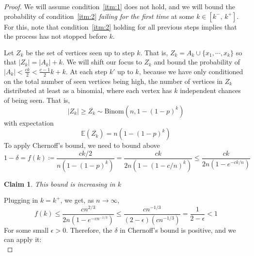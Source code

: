 \documentclass{amsart}
\theoremstyle{plain}
\newtheorem*{claim}{\textbf{Claim}}
\theoremstyle{definition}
\begin{document}
    \begin{proof}
        \vspace{-3mm}
        We will assume condition~\ref{itm:1} does not hold, and we will bound the probability of
        condition~\ref{itm:2} \emph{failing for the first time} at some $k \in [k^{-}, \, k^{+}]$.
        For this, note that condition~\ref{itm:2} holding for all previous steps implies that
        the process has not stopped before $k$.

        \noindent Let $Z_k$ be the set of vertices seen up to step $k$.
        That is, $Z_k = A_k \cup \{x_1, \cdots, x_k\}$ so that $|Z_k| = |A_k| + k$.
        We will shift our focus to $Z_k$ and bound the probability of $|A_k| < \frac{ck}{2} < \frac{c-1}{2}k + k$.
        At each step $k'$ up to $k$, because we have only conditioned on the total number of seen vertices being high,
        the number of vertices in $Z_k$ distributed at least as a binomial,
        where each vertex has $k$ independent chances of being seen.
        That is,
        \begin{equation}
            |Z_k| \geq \overline{Z_k} \sim \text{Binom}\left(n, 1 - (1 - p)^k\right)
            \label{eq:binom}
        \end{equation}
        with expectation
        \begin{equation}
            \mathbb{E}\left(\overline{Z_k}\right) = n\left(1 - (1 - p)^k\right)
            \label{eq:expec}
        \end{equation}
    To apply Chernoff's bound, we need to bound above
    \begin{equation}
        1 - \delta = f(k) \coloneqq \frac{ck/2}{n\left(1 - (1 - p)^k\right)} =
        \frac{ck}{2n\left(1 - (1 - c/n)^k\right)} \leq \frac{ck}{2n\left(1 - e^{-ck/n}\right)}
        \label{eq:ff}
    \end{equation}
    \begin{claim}
        This bound is increasing in $k$ %
    \end{claim}
    \noindent Plugging in $k = k^{+}$, we get, as $n \to \infty$,
    \begin{equation}
        f(k) \leq
        \frac{cn^{2/3}}{2n\left(1 - e^{-cn^{-1/3}}\right)} \leq
        \frac{cn^{-1/3}}{(2-\epsilon)\left(cn^{-1/3}\right)} = \frac{1}{2-\epsilon} < 1
        \label{eq:fbound_2}
    \end{equation}
    For some small $\epsilon > 0$.
    Therefore, the $\delta$ in Chernoff's bound is positive, and we can apply it:
    \begin{equation}

\end{equation}
\end{proof}
\end{document}
